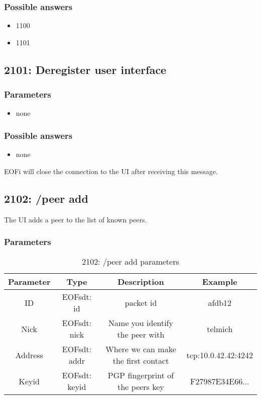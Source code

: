 \subsubsection{Possible answers}
\begin{itemize}
\item 1100
\item 1101
\end{itemize}
\subsection{2101: Deregister user interface}

\subsubsection{Parameters}
\begin{itemize}
\item none
\end{itemize}

\subsubsection{Possible answers}
\begin{itemize}
\item none
\end{itemize}

EOFi will close the connection to the UI after receiving this message.

\subsection{2102: /peer add}
The UI adds a peer to the list of known peers.

\subsubsection{Parameters}
%
\begin{longtable}{|c|c|c|c|}
\caption{2102: /peer add parameters}\\
\hline
\textbf{Parameter} & \textbf{Type} & \textbf{Description} & \textbf{Example}\\
\hline
ID & EOFsdt: id & packet id & afdb12\\
\hline
Nick & EOFsdt: nick & Name you identify the peer with & telmich\\
\hline
Address & EOFsdt: addr & Where we can make the first contact & tcp:10.0.42.42:4242\\
\hline
Keyid & EOFsdt: keyid & PGP fingerprint of the peers key & F27987E34E66...\\
\hline
\end{longtable}

